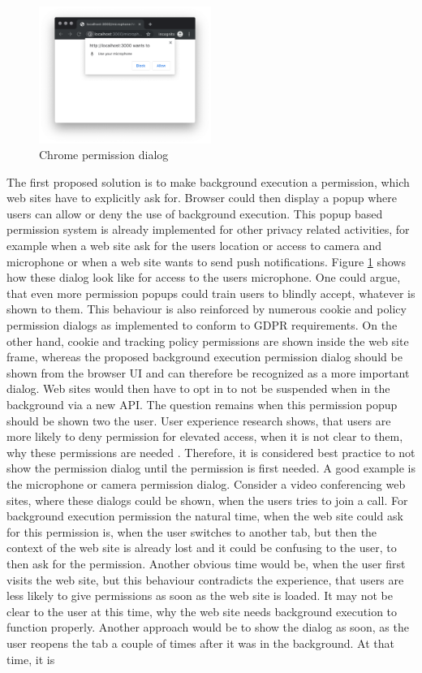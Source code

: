 \documentclass[
	ruledheaders=section,%
	class=report,%
	thesis={type=bachelor},%
	accentcolor=9c,%
	custommargins=true,%
	marginpar=false,%
	parskip=half-,%
	fontsize=11pt,%
]{tudapub}
\begin{document}
  \begin{figure}
    \centering
    \includegraphics[width=0.5\textwidth]{images/microphone-permission.png}
    \caption{Chrome permission dialog}
    \label{fig:chrome-permission-dialog}
  \end{figure}

  The first proposed solution is to make background execution a permission, which web sites have to explicitly ask for. Browser could then display a popup where users can allow or deny the use of background execution. This popup based permission system is already implemented for other privacy related activities, for example when a web site ask for the users location or access to camera and microphone or when a web site wants to send push notifications. Figure \ref{fig:chrome-permission-dialog} shows how these dialog look like for access to the users microphone. One could argue, that even more permission popups could train users to blindly accept, whatever is shown to them. This behaviour is also reinforced by numerous cookie and policy permission dialogs as implemented to conform to GDPR requirements. On the other hand, cookie and tracking policy permissions are shown inside the web site frame, whereas the proposed background execution permission dialog should be shown from the browser UI and can therefore be recognized as a more important dialog. Web sites would then have to opt in to not be suspended when in the background via a new API. The question remains when this permission popup should be shown two the user. User experience research shows, that users are more likely to deny permission for elevated access, when it is not clear to them, why these permissions are needed \cite{bonne2017exploring}. Therefore, it is considered best practice to not show the permission dialog until the permission is first needed. A good example is the microphone or camera permission dialog. Consider a video conferencing web sites, where these dialogs could be shown, when the users tries to join a call. For background execution permission the natural time, when the web site could ask for this permission is, when the user switches to another tab, but then the context of the web site is already lost and it could be confusing to the user, to then ask for the permission. Another obvious time would be, when the user first visits the web site, but this behaviour contradicts the experience, that users are less likely to give permissions as soon as the web site is loaded. It may not be clear to the user at this time, why the web site needs background execution to function properly. Another approach would be to show the dialog as soon, as the user reopens the tab a couple of times after it was in the background. At that time, it is 
\end{document}
